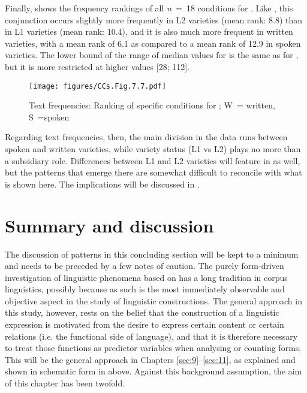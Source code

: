 Finally,  shows the frequency rankings of all \textit{n~}=~18 conditions for . Like , this conjunction occurs slightly more frequently in L2 varieties (mean rank: 8.8) than in L1 varieties (mean rank: 10.4), and it is also much more frequent in written varieties, with a mean rank of 6.1 as compared to a mean rank of 12.9 in spoken varieties. The lower bound of the range of median values for  is the same as for , but it is more restricted at higher values [28; 112].

\begin{figure}
\texttt{[image: figures/CCs.Fig.7.7.pdf]}
\caption{\label{bkm:Ref52266690}\label{fig:7.7}Text frequencies: Ranking of specific conditions for ; W~= written, S~=spoken}
\end{figure}

Regarding text frequencies, then, the main division in the data runs between spoken and written varieties, while variety status (L1 vs L2) plays no more than a subsidiary role. Differences between L1 and L2 varieties will feature in  as well, but the patterns that emerge there are somewhat difficult to reconcile with what is shown here. The implications will be discussed in .

\section{\label{bkm:Ref51831577}Summary and discussion}\label{sec:7.4}

The discussion of  patterns in this concluding section will be kept to a minimum and needs to be preceded by a few notes of caution. The purely form-driven investigation of linguistic phenomena based on  has a long tradition in corpus linguistics, possibly because  as such is the most immediately observable and objective aspect in the study of linguistic constructions. The general approach in this study, however, rests on the belief that the construction of a linguistic expression is motivated from the desire to express certain content or certain relations (i.e. the functional side of language), and that it is therefore necessary to treat those functions as predictor variables when analysing or counting forms. This will be the general approach in Chapters \ref{sec:9}–\ref{sec:11}, as explained and shown in schematic form in  above. Against this background assumption, the aim of this chapter has been twofold.

